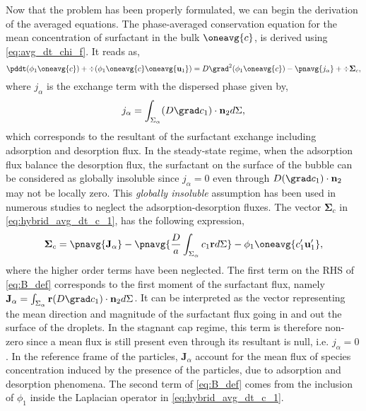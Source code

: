 Now that the problem has been properly formulated, we can begin the derivation of the averaged equations.
The phase-averaged conservation equation for the mean concentration of surfactant in the bulk $\oneavg{c}$, is derived using \ref{eq:avg_dt_chi_f}.
It reads as,
\begin{equation}
    \pddt (\phi_1 \oneavg{c})
    + \div (\phi_1 \oneavg{c} \oneavg{\textbf{u}_1})
    = D \grad^2 (\phi_1\oneavg{c})
    - \pnavg{j_\alpha}
    +  \div \mathbf{\Sigma}_c,
    \label{eq:hybrid_avg_dt_c_1}
\end{equation}
where $j_\alpha$ is the exchange term with the dispersed phase given by,
\begin{equation*}
    j_\alpha
    =\int_{\Sigma_\alpha}
    (D\grad c_1 )
\cdot \textbf{n}_2d\Sigma,
\end{equation*}
which corresponds to the resultant of the surfactant exchange including adsorption and desorption flux.  
In the steady-state regime, when the adsorption flux balance the desorption flux,  the surfactant on the surface of the bubble can be considered as globally insoluble since $j_\alpha=0$ even through $D(\grad c_1 ) \cdot \textbf{n}_2$ may not be locally zero. 
This \textit{globally insoluble} assumption has been used in numerous studies to neglect the adsorption-desorption fluxes. 
The vector $\mathbf{\Sigma}_c$ in \ref{eq:hybrid_avg_dt_c_1}, has the following expression,
\begin{equation}
    \mathbf{\Sigma}_c
    =
     \pnavg{\textbf{J}_\alpha}
    - \pnavg{\frac{D}{a}\int_{\Sigma_\alpha}  c_1 \textbf{r} d\Sigma}
    - \phi_1\oneavg{c'_1\textbf{u}_1'},
    \label{eq:B_def}
\end{equation}
where the higher order terms have been neglected. 
The first term on the RHS of \ref{eq:B_def} corresponds to the first moment of the surfactant flux, namely $\textbf{J}_\alpha = \int_{\Sigma_\alpha} \textbf{r}
(D\grad c_1)\cdot \textbf{n}_2d\Sigma$.
It can be interpreted as the vector representing the mean direction and magnitude of the surfactant flux going in and out the surface of the droplets.
In the stagnant cap regime, this term is therefore non-zero since a mean flux is still present even through its resultant is null, i.e. $j_\alpha=0$.
In the reference frame of the particles, $\textbf{J}_\alpha$ account for the mean flux of species concentration induced by the presence of the particles, due to adsorption and desorption phenomena. 
The second term of \ref{eq:B_def} comes from the inclusion of $\phi_1$ inside the Laplacian operator in \ref{eq:hybrid_avg_dt_c_1}.
